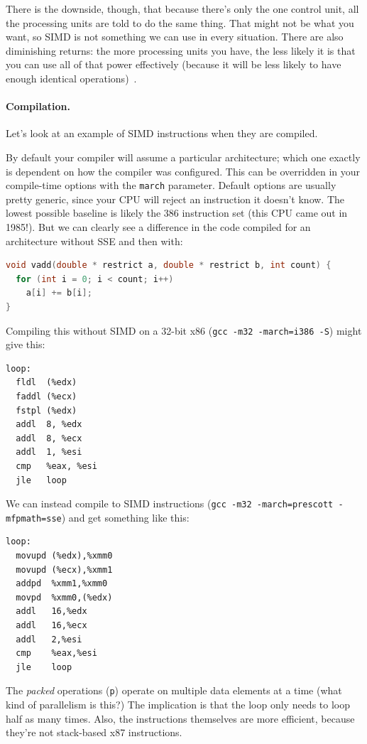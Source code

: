 \documentclass[a4paper]{report}
\begin{document}
There is the downside, though, that because there's only the one control unit, all the processing units are told to do the same thing. That might not be what you want, so SIMD is not something we can use in every situation. There are also diminishing returns: the more processing units you have, the less likely it is that you can use all of that power effectively (because it will be less likely to have enough identical operations)~\cite{sse}.

\paragraph{Compilation.} Let's look at an example of SIMD instructions when they are compiled.

By default your compiler will assume a particular architecture; which one exactly is dependent on how the compiler was configured. This can be overridden in your compile-time options with the \texttt{march} parameter. Default options are usually pretty generic, since your CPU will reject an instruction it doesn't know. The lowest possible baseline is likely the 386 instruction set (this CPU came out in 1985!). But we can clearly see a difference in the code compiled for an architecture without SSE and then with:

\begin{lstlisting}[language=C]
void vadd(double * restrict a, double * restrict b, int count) {
  for (int i = 0; i < count; i++)
    a[i] += b[i];
}
\end{lstlisting}

Compiling this without SIMD on a 32-bit x86 ({\tt gcc -m32 -march=i386 -S}) might give this:
\begin{verbatim}
loop:
  fldl  (%edx)
  faddl (%ecx)
  fstpl (%edx)
  addl  8, %edx
  addl  8, %ecx
  addl  1, %esi
  cmp   %eax, %esi
  jle   loop
\end{verbatim}

We can instead compile to SIMD instructions ({\tt gcc -m32 -march=prescott -mfpmath=sse})
and get something like this:
\begin{verbatim}
loop:
  movupd (%edx),%xmm0
  movupd (%ecx),%xmm1
  addpd  %xmm1,%xmm0
  movpd  %xmm0,(%edx)
  addl   16,%edx
  addl   16,%ecx
  addl   2,%esi
  cmp    %eax,%esi
  jle    loop
\end{verbatim}
The \emph{packed} operations ({\tt p}) operate on multiple data
elements at a time (what kind of parallelism is this?)
The implication is that the loop only needs to loop half as many times.
Also, the instructions themselves are more efficient, because they're
not stack-based x87 instructions.
\end{document}
